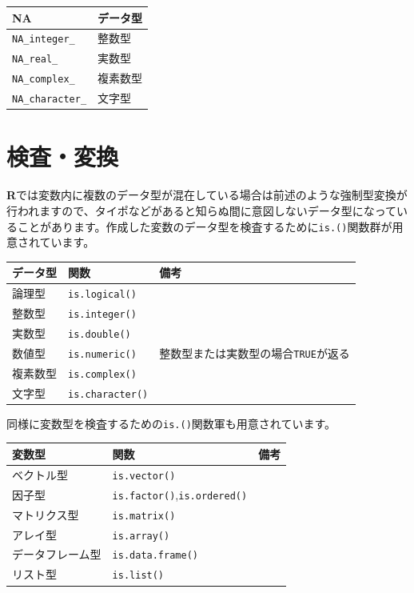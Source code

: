\documentclass[
  12pt,
]{book}
\begin{document}
\begin{longtable}[]{@{}ll@{}}
\toprule
NA & データ型 \\
\midrule
\endhead
\texttt{NA\_integer\_} & 整数型 \\
\texttt{NA\_real\_} & 実数型 \\
\texttt{NA\_complex\_} & 複素数型 \\
\texttt{NA\_character\_} & 文字型 \\
\bottomrule
\end{longtable}

\hypertarget{ux691cux67fbux5909ux63db}{%
\section{検査・変換}\label{ux691cux67fbux5909ux63db}}

\textbf{R}では変数内に複数のデータ型が混在している場合は前述のような強制型変換が行われますので、タイポなどがあると知らぬ間に意図しないデータ型になっていることがあります。作成した変数のデータ型を検査するために\texttt{is.()}関数群が用意されています。

\begin{longtable}[]{@{}lll@{}}
\toprule
データ型 & 関数 & 備考 \\
\midrule
\endhead
論理型 & \texttt{is.logical()} & \\
整数型 & \texttt{is.integer()} & \\
実数型 & \texttt{is.double()} & \\
数値型 & \texttt{is.numeric()} & 整数型または実数型の場合\texttt{TRUE}が返る \\
複素数型 & \texttt{is.complex()} & \\
文字型 & \texttt{is.character()} & \\
\bottomrule
\end{longtable}

同様に変数型を検査するための\texttt{is.()}関数軍も用意されています。

\begin{longtable}[]{@{}lll@{}}
\toprule
変数型 & 関数 & 備考 \\
\midrule
\endhead
ベクトル型 & \texttt{is.vector()} & \\
因子型 & \texttt{is.factor()},\texttt{is.ordered()} & \\
マトリクス型 & \texttt{is.matrix()} & \\
アレイ型 & \texttt{is.array()} & \\
データフレーム型 & \texttt{is.data.frame()} & \\
リスト型 & \texttt{is.list()} & \\
\bottomrule
\end{longtable}
\end{document}
